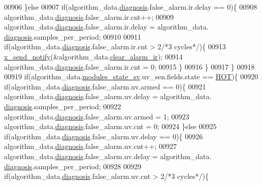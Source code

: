 \begin{DoxyCode}
{{{{{00906             \}\textcolor{keywordflow}{else}
00907             \textcolor{keywordflow}{if}(algorithm\_data.\hyperlink{a00016_a16f85d57ec98b4ad05f5a2e10536b3c6}{diagnosis}.false\_alarm.ir.delay == 0)\{
00908               algorithm\_data.\hyperlink{a00016_a16f85d57ec98b4ad05f5a2e10536b3c6}{diagnosis}.false\_alarm.ir.cnt++;
00909               algorithm\_data.\hyperlink{a00016_a16f85d57ec98b4ad05f5a2e10536b3c6}{diagnosis}.false\_alarm.ir.delay = algorithm\_data.
      \hyperlink{a00016_a16f85d57ec98b4ad05f5a2e10536b3c6}{diagnosis}.samples\_per\_period;
00910 
00911               \textcolor{keywordflow}{if}(algorithm\_data.\hyperlink{a00016_a16f85d57ec98b4ad05f5a2e10536b3c6}{diagnosis}.false\_alarm.ir.cnt > 2\textcolor{comment}{/*3 cycles*/})\{
00913                \hyperlink{a00036_ae17b0bb16da3c471bb6074bb4c4d0fee}{x\_send\_notify}(&algorithm\_data.\hyperlink{a00016_a5ef7ebf1a1e20f770d46232ab2be8312}{clear\_alarm\_ir});
00914                algorithm\_data.\hyperlink{a00016_a16f85d57ec98b4ad05f5a2e10536b3c6}{diagnosis}.false\_alarm.ir.cnt = 0;
00915                \}
00916             \}
00917         \}
00918 
00919         \textcolor{keywordflow}{if}(algorithm\_data.\hyperlink{a00016_a293140e240bbd54f7601adbc9194148c}{modules\_state\_sv}.uv\_sen.fields.state == 
      \hyperlink{a00021_a1eb14cc432874ddacd1934791dbe12a3}{HOT})\{
00920             \textcolor{keywordflow}{if}(algorithm\_data.\hyperlink{a00016_a16f85d57ec98b4ad05f5a2e10536b3c6}{diagnosis}.false\_alarm.uv.armed == 0)\{
00921               algorithm\_data.\hyperlink{a00016_a16f85d57ec98b4ad05f5a2e10536b3c6}{diagnosis}.false\_alarm.uv.delay  = algorithm\_data.
      \hyperlink{a00016_a16f85d57ec98b4ad05f5a2e10536b3c6}{diagnosis}.samples\_per\_period;
00922                algorithm\_data.\hyperlink{a00016_a16f85d57ec98b4ad05f5a2e10536b3c6}{diagnosis}.false\_alarm.uv.armed = 1;
00923                algorithm\_data.\hyperlink{a00016_a16f85d57ec98b4ad05f5a2e10536b3c6}{diagnosis}.false\_alarm.uv.cnt   = 0;
00924             \}\textcolor{keywordflow}{else}
00925             \textcolor{keywordflow}{if}(algorithm\_data.\hyperlink{a00016_a16f85d57ec98b4ad05f5a2e10536b3c6}{diagnosis}.false\_alarm.uv.delay == 0)\{
00926               algorithm\_data.\hyperlink{a00016_a16f85d57ec98b4ad05f5a2e10536b3c6}{diagnosis}.false\_alarm.uv.cnt++;
00927               algorithm\_data.\hyperlink{a00016_a16f85d57ec98b4ad05f5a2e10536b3c6}{diagnosis}.false\_alarm.uv.delay = algorithm\_data.
      \hyperlink{a00016_a16f85d57ec98b4ad05f5a2e10536b3c6}{diagnosis}.samples\_per\_period;
00928 
00929               \textcolor{keywordflow}{if}(algorithm\_data.\hyperlink{a00016_a16f85d57ec98b4ad05f5a2e10536b3c6}{diagnosis}.false\_alarm.uv.cnt > 2\textcolor{comment}{/*3 cycles*/})\{
}}}}}
\end{DoxyCode}
